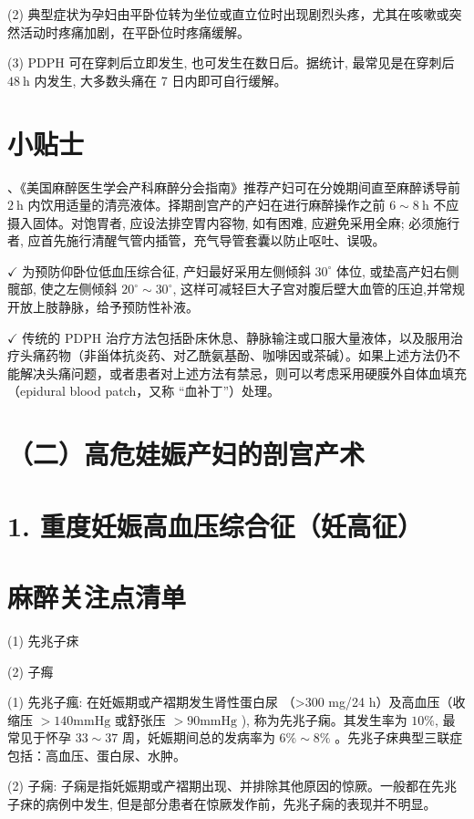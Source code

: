 \documentclass[10pt]{article}
\begin{document}
(2) 典型症状为孕妇由平卧位转为坐位或直立位时出现剧烈头疼，尤其在咳嗽或突然活动时疼痛加剧，在平卧位时疼痛缓解。

(3) PDPH 可在穿刺后立即发生, 也可发生在数日后。据统计, 最常见是在穿刺后 $48 \mathrm{~h}$ 内发生, 大多数头痛在 7 日内即可自行缓解。

\section*{小贴士}
、《美国麻醉医生学会产科麻醉分会指南》推荐产妇可在分娩期间直至麻醉诱导前 $2 \mathrm{~h}$ 内饮用适量的清亮液体。择期剖宫产的产妇在进行麻醉操作之前 $6 \sim 8 \mathrm{~h}$ 不应摄入固体。对饱胃者, 应设法排空胃内容物, 如有困难, 应避免采用全麻; 必须施行者, 应首先施行清醒气管内插管，充气导管套囊以防止呕吐、误吸。

$\checkmark$ 为预防仰卧位低血压综合征, 产妇最好采用左侧倾斜 $30^{\circ}$ 体位, 或垫高产妇右侧髋部, 使之左侧倾斜 $20^{\circ} \sim 30^{\circ}$, 这样可减轻巨大子宫对腹后壁大血管的压迫,并常规开放上肢静脉，给予预防性补液。

$\checkmark$ 传统的 PDPH 治疗方法包括卧床休息、静脉输注或口服大量液体，以及服用治疗头痛药物（非甾体抗炎药、对乙酰氨基酚、咖啡因或茶碱）。如果上述方法仍不能解决头痛问题，或者患者对上述方法有禁忌，则可以考虑采用硬膜外自体血填充（epidural blood patch，又称 “血补丁”）处理。

\section*{（二）高危娃娠产妇的剖宫产术}
\section*{1. 重度妊娠高血压综合征（妊高征）}
\section*{麻醉关注点清单}
(1) 先兆子㾁

(2) 子痗

(1) 先兆子瘋: 在妊娠期或产褶期发生肾性蛋白尿 （>300 mg/24 h）及高血压（收缩压 $>140 \mathrm{mmHg}$ 或舒张压 $>90 \mathrm{mmHg}$ ), 称为先兆子痫。其发生率为 $10 \%$, 最常见于怀孕 $33 \sim 37$ 周，奼娠期间总的发病率为 $6 \% \sim 8 \%$ 。先兆子㾁典型三联症包括：高血压、蛋白尿、水肿。

(2) 子痫: 子痫是指奼娠期或产褶期出现、并排除其他原因的惊厥。一般都在先兆子㾁的病例中发生, 但是部分患者在惊厥发作前，先兆子痫的表现并不明显。
\end{document}
